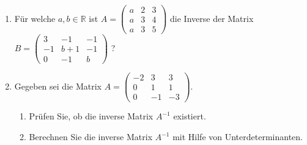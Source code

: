 \documentclass[12pt,a4paper]{scrreprt}
\newcommand{\R}{\mathds{R}}
\begin{document}
\begin{enumerate}
\begin{enumerate}
	\end{enumerate}

	\item Für welche $a,b \in \R$ ist $A=\begin{pmatrix}
a & 2 & 3 \\
a & 3 & 4\\
a & 3 & 5
\end{pmatrix}$ die Inverse der Matrix \\ $B=\begin{pmatrix}
3 & -1 & -1 \\
-1 & b+1 &-1\\
0 & -1 & b
\end{pmatrix}$ ?

\begin{comment}
Inverse von $A$ gibt es nur für $det(A) \neq 0$
also hier $A$ mit $B$ multiplizieren und mit der Einheitsmatrix gleichsetzen
3a-2=1 \Rightarrow a=1
-a+3(b+1)-4 \Rightarrow b=1
restliche Werte auch prüfen
\end{comment}

	\item 
 Gegeben sei die Matrix
$A=\begin{pmatrix}
-2 & 3 & 3 \\
0 & 1 & 1\\
0 & -1 & -3
\end{pmatrix}.$
	\begin{enumerate}
		\item Prüfen Sie, ob die inverse Matrix $A^{-1}$ existiert.
\begin{comment}
wenn det(A)\neq0, dann existiert A^{-1}
det(A) = (-2)*(-2) = 4 \Rightarrow A^{-1} existiert
\end{comment}

		\item Berechnen Sie die inverse Matrix $A^{-1}$ mit Hilfe von Unterdeterminanten.
\begin{comment}
(A^{-1})^T = \fraq{1}{det(A)}*A'
A'_{ij} = (-1)^{i+j}D_{ij}
A'_{11} = 1 * | 1 1 \\ -1 -3 | = (-3)-(-1) = -2
A'_{12} = -1 * | 0 1 \\ 0 -3 | = 0
A'_{13} = 1 * | 0 1 \\ 9 -1 | = 0
A'_{21} = -1* | 3 3 \\ -1 -3 | = 6
\vdots
A'_{33} = -2
A^{-1} = \left( \frac{1}{4} \begin{pmatrix} -2 0 0 \\ 6 6 2 \\ 0 -2 -2 \end{pmatrix} \right)^T
= \begin{pmatrix} -2 6 0 \\ 0 6 -2 \\ 0 2 -2 \end{pmatrix} 
\end{comment}


\end{enumerate}
\end{enumerate}
\end{document}
